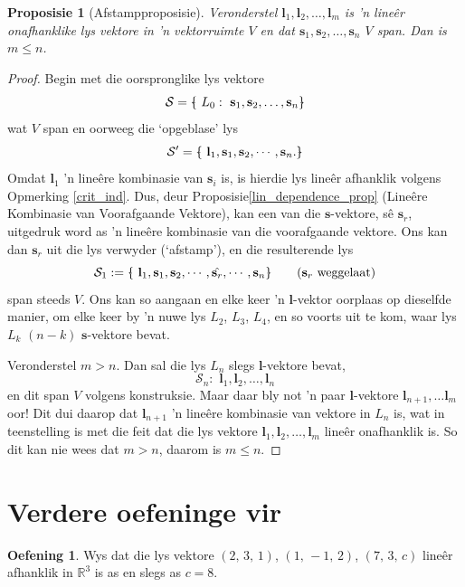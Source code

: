 \documentclass[a4paper,11pt]{book}
\newtheorem{proposition}[theorem]{Proposisie}
\theoremstyle{definition}
\newtheorem{exercise}{Oefening}
\newcommand{\be}{\begin{equation}}
\newcommand{\ee}{\end{equation}}
\newcommand{\ve}[1]{\mathbf{#1}}
\newcommand{\basis}[1]{{\mathcal #1}}
\newcommand{\furtherexercises}{\section*{Verdere oefeninge vir
\thesection}}
\newcommand{\bmark}{\raisebox{.53ex}{\rule{.2em}{.1ex}}}
\newcommand{\bopen}{{\protect\ooalign{\{\cr\hfil\bmark\hfil\cr}}}
\newcommand{\bclose}{{\protect\ooalign{\}\cr\hfil\bmark\hfil\cr}}}
\begin{document}
\begin{proposition}[Afstampproposisie] Veronderstel $\ve{l}_1, \ve{l}_2,
	\ldots, \ve{l}_m$ is 'n line{\^e}r onafhanklike lys vektore in 'n
	vektorruimte $V$ en dat  $\ve{s}_1, \ve{s}_2, \ldots, \ve{s}_n$ $V$
	span. Dan is $m \leq n$. \label{bumping_off_lemma}
\end{proposition}
\begin{proof} Begin met die oorspronglike lys vektore
	\be
	\basis{S} = \bopen \,\, L_0: \,\,  \ve{s}_1, \ve{s}_2, \ldots, \ve{s}_n
	\bclose
	\ee
	wat $V$ span en oorweeg die `opgeblase' lys
	\be \label{bloated_list}
	\basis{S^{\prime}} = \bopen \,\, \ve{l}_1, \ve{s}_1, \ve{s}_2, \cdots,
	\ve{s}_n.
	\bclose
	\ee
	Omdat $\ve{l}_1$ 'n line{\^e}re kombinasie van $\ve{s}_i$ is, is
	hierdie lys line{\^e}r afhanklik volgens Opmerking \ref{crit_ind}. Dus,
	deur Proposisie\ref{lin_dependence_prop} (Line{\^e}re Kombinasie van
	Voorafgaande Vektore), kan een van die $\ve{s}$-vektore, s{\^e}
	$\ve{s}_r$, uitgedruk word as 'n line{\^e}re kombinasie van die
	voorafgaande vektore. Ons kan dan $\ve{s}_r$ uit die lys verwyder
	(`afstamp'), en die resulterende lys
	\be
	\basis{S_1}:= \bopen \,\, \ve{l}_1, \ve{s}_1, \ve{s}_2, \cdots,
	\hat{\ve{s}_r}, \cdots,
	\ve{s}_n  \bclose \qquad \mbox{($\ve{s}_r$ weggelaat)}
	\ee
	span steeds $V$. Ons kan so aangaan en elke keer 'n $\ve{l}$-vektor
	oorplaas op dieselfde manier, om elke keer by 'n nuwe lys $L_2$, $L_3$,
	$L_4$, en so voorts uit te kom, waar lys $L_k$ $(n-k)$ $\ve{s}$-vektore
	bevat.

	Veronderstel $m > n$. Dan sal die lys $L_n$ slegs $\ve{l}$-vektore
	bevat,
	\[
		\basis{S_n}: \,\, \ve{l}_1, \ve{l}_2, \ldots, \ve{l}_n
	\]
	en dit span $V$ volgens konstruksie. Maar daar bly not 'n paar
	$\ve{l}$-vektore $\ve{l}_{n+1}, \ldots \ve{l}_{m}$ oor! Dit dui daarop
	dat $\ve{l}_{n+1}$ 'n line{\^e}re kombinasie van vektore in $L_n$ is,
	wat in teenstelling is met die feit dat die lys vektore $\ve{l}_1,
	\ve{l}_2, \ldots, \ve{l}_m$ line{\^e}r onafhanklik is. So dit kan nie
	wees dat $m > n$, daarom is $m \leq n$.
\end{proof}

\furtherexercises
\begin{exercise} \label{exercise_for_new_basis}Wys dat die lys vektore $(2,
	\, 3, \, 1)$, $(1, \, -1, \,
	2)$, $(7, \, 3, \, c)$ line{\^e}r afhanklik in $\mathbb{R}^3$ is as en
	slegs as $c=8$.
\end{exercise}
\end{document}
